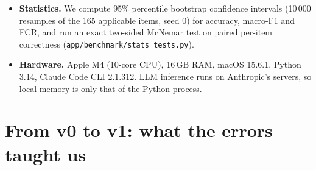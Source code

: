 \begin{itemize}[leftmargin=*]
\begin{enumerate}[label=(\alph*), leftmargin=*]
        \end{enumerate}
  \item \textbf{Statistics.} We compute 95\% percentile bootstrap confidence intervals (10\,000 resamples of the 165
        applicable items, seed 0) for accuracy, macro-F1 and FCR, and run an exact two-sided McNemar test on paired
        per-item correctness (\texttt{app/benchmark/stats\_tests.py}).
  \item \textbf{Hardware.} Apple M4 (10-core CPU), 16\,GB RAM, macOS 15.6.1, Python 3.14, Claude Code CLI 2.1.312. LLM
        inference runs on Anthropic's servers, so local memory is only that of the Python process.
\end{itemize}

\section{From v0 to v1: what the errors taught us}
\label{section:v1}

